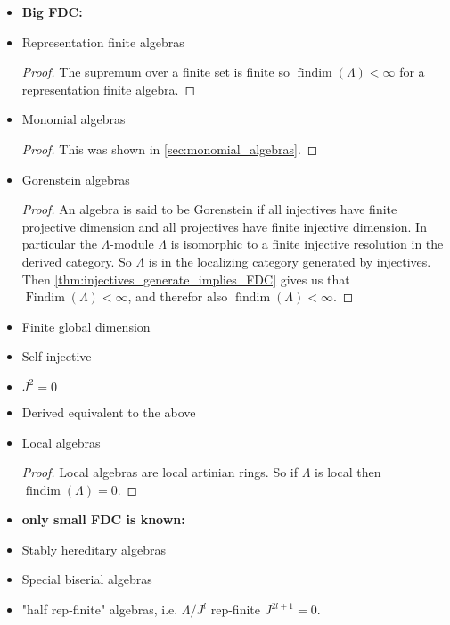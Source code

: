 \documentclass[11pt, a4paper, english]{article}
\theoremstyle{definition}
\DeclareMathOperator{\findim}{findim}
\DeclareMathOperator{\Findim}{Findim}
\begin{document}
\begin{itemize}
	\item \textbf{Big FDC:}
	\item Representation finite algebras
	\begin{proof}
		The supremum over a finite set is finite so $\findim(\Lambda) < \infty$ for a representation finite algebra.
	\end{proof}
	\item Monomial algebras
	\begin{proof}
		This was shown in \cref{sec:monomial_algebras}.
	\end{proof}
	\item Gorenstein algebras
	\begin{proof}
		An algebra is said to be Gorenstein if all injectives have finite projective dimension and all projectives have finite injective dimension. In particular the $\Lambda$-module $\Lambda$ is isomorphic to a finite injective resolution in the derived category. So $\Lambda$ is in the localizing category generated by injectives. Then \cref{thm:injectives_generate_implies_FDC} gives us that $\Findim(\Lambda) < \infty$, and therefor also $\findim(\Lambda) < \infty$.
	\end{proof}
	\item Finite global dimension
	\item Self injective
	\item $J^2 = 0$
	\item Derived equivalent to the above
	\item Local algebras
	\begin{proof}
		Local algebras are local artinian rings. So if $\Lambda$ is local then $\findim(\Lambda)=0$.
	\end{proof}
	\item \textbf{only small FDC is known:}
	\item Stably hereditary algebras
	\item Special biserial algebras
	\item "half rep-finite" algebras, i.e. $\Lambda/J^l$ rep-finite $J^{2l+1}=0$.
\end{itemize}
\end{document}
